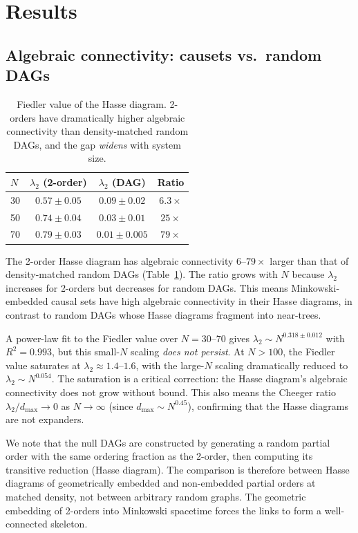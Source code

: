 \documentclass[aps,prd,twocolumn,superscriptaddress,nofootinbib]{revtex4-2}
\begin{document}
\section{Results}

\subsection{Algebraic connectivity: causets vs.\ random DAGs}

\begin{table}[h]
\centering
\begin{tabular}{lccc}
\toprule
$N$ & $\lambda_2$ (2-order) & $\lambda_2$ (DAG) & Ratio \\
\midrule
30 & $0.57 \pm 0.05$ & $0.09 \pm 0.02$ & $6.3\times$ \\
50 & $0.74 \pm 0.04$ & $0.03 \pm 0.01$ & $25\times$ \\
70 & $0.79 \pm 0.03$ & $0.01 \pm 0.005$ & $79\times$ \\
\bottomrule
\end{tabular}
\caption{Fiedler value of the Hasse diagram. 2-orders have dramatically higher algebraic connectivity than density-matched random DAGs, and the gap \emph{widens} with system size.}
\label{tab:fiedler}
\end{table}

The 2-order Hasse diagram has algebraic connectivity 6--$79\times$ larger than that of density-matched random DAGs (Table~\ref{tab:fiedler}). The ratio grows with $N$ because $\lambda_2$ increases for 2-orders but decreases for random DAGs. This means Minkowski-embedded causal sets have high algebraic connectivity in their Hasse diagrams, in contrast to random DAGs whose Hasse diagrams fragment into near-trees.

A power-law fit to the Fiedler value over $N = 30$--$70$ gives $\lambda_2 \sim N^{0.318 \pm 0.012}$ with $R^2 = 0.993$, but this small-$N$ scaling \emph{does not persist}. At $N > 100$, the Fiedler value saturates at $\lambda_2 \approx 1.4$--$1.6$, with the large-$N$ scaling dramatically reduced to $\lambda_2 \sim N^{0.054}$. The saturation is a critical correction: the Hasse diagram's algebraic connectivity does not grow without bound. This also means the Cheeger ratio $\lambda_2 / d_{\max} \to 0$ as $N \to \infty$ (since $d_{\max} \sim N^{0.45}$), confirming that the Hasse diagrams are not expanders.

We note that the null DAGs are constructed by generating a random partial order with the same ordering fraction as the 2-order, then computing its transitive reduction (Hasse diagram). The comparison is therefore between Hasse diagrams of geometrically embedded and non-embedded partial orders at matched density, not between arbitrary random graphs. The geometric embedding of 2-orders into Minkowski spacetime forces the links to form a well-connected skeleton.
\end{document}
